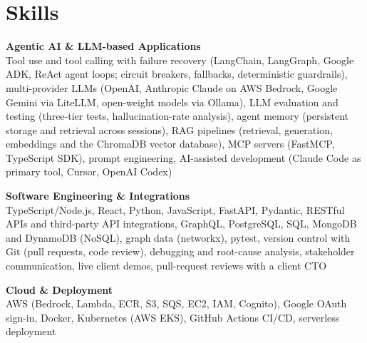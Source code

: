 \documentclass[a4paper,11pt]{article}
\newcommand{\skillgroup}[2]{{\color{headernavy}\textbf{#1}}\\ #2\par\vspace{3pt}}
\begin{document}
\section{Skills}
\skillgroup{Agentic AI \& LLM-based Applications}{Tool use and tool calling with failure recovery (LangChain, LangGraph, Google ADK, ReAct agent loops; circuit breakers, fallbacks, deterministic guardrails), multi-provider LLMs (OpenAI, Anthropic Claude on AWS Bedrock, Google Gemini via LiteLLM, open-weight models via Ollama), LLM evaluation and testing (three-tier tests, hallucination-rate analysis), agent memory (persistent storage and retrieval across sessions), RAG pipelines (retrieval, generation, embeddings and the ChromaDB vector database), MCP servers (FastMCP, TypeScript SDK), prompt engineering, AI-assisted development (Claude Code as primary tool, Cursor, OpenAI Codex)}
\skillgroup{Software Engineering \& Integrations}{TypeScript/Node.js, React, Python, JavaScript, FastAPI, Pydantic, RESTful APIs and third-party API integrations, GraphQL, PostgreSQL, SQL, MongoDB and DynamoDB (NoSQL), graph data (networkx), pytest, version control with Git (pull requests, code review), debugging and root-cause analysis, stakeholder communication, live client demos, pull-request reviews with a client CTO}
\skillgroup{Cloud \& Deployment}{AWS (Bedrock, Lambda, ECR, S3, SQS, EC2, IAM, Cognito), Google OAuth sign-in, Docker, Kubernetes (AWS EKS), GitHub Actions CI/CD, serverless deployment}
\end{document}
